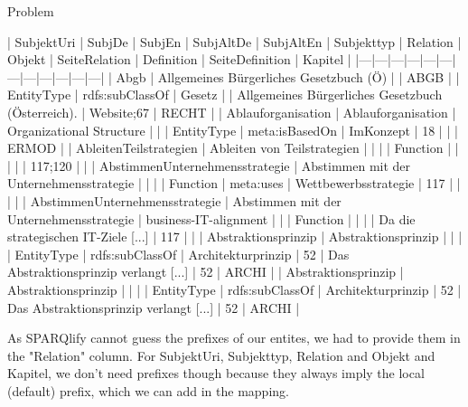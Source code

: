 \documentclass{beamer}
\begin{document}
\begin{frame}{Problem}
\begin{frame}{}
\begin{frame}{}
\begin{frame}{}
| SubjektUri                     	| SubjDe                                  	| SubjEn                   	| SubjAltDe 	| SubjAltEn 	| Subjekttyp  	| Relation        	| Objekt               	| SeiteRelation 	| Definition                                        	| SeiteDefinition 	| Kapitel 	|
|---|---|---|---|---|---|---|---|---|---|---|---|
| Abgb                           	| Allgemeines Bürgerliches Gesetzbuch (Ö) 	|                          	| ABGB      	|           	| EntityType  	| rdfs:subClassOf 	| Gesetz               	|               	| Allgemeines Bürgerliches Gesetzbuch (Österreich). 	| Website;67      	| RECHT   	|
| Ablauforganisation             	| Ablauforganisation                      	| Organizational Structure 	|           	|           	| EntityType  	| meta:isBasedOn  	| ImKonzept            	| 18            	|                                                   	|                 	| ERMOD   	|
| AbleitenTeilstrategien         	| Ableiten von Teilstrategien             	|                          	|           	|           	| Function    	|                 	|                      	|               	|                                                   	| 117;120         	|         	|
| AbstimmenUnternehmensstrategie 	| Abstimmen mit der Unternehmensstrategie 	|                          	|           	|           	| Function    	| meta:uses       	| Wettbewerbsstrategie 	| 117           	|                                                   	|                 	|         	|
| AbstimmenUnternehmensstrategie 	| Abstimmen mit der Unternehmensstrategie 	| business-IT-alignment    	|           	|           	| Function    	|                 	|                      	|               	| Da die strategischen IT-Ziele [...]               	| 117             	|         	|
| Abstraktionsprinzip            	| Abstraktionsprinzip                     	|                          	|           	|           	| EntityType  	| rdfs:subClassOf 	| Architekturprinzip   	| 52            	| Das Abstraktionsprinzip verlangt [...]            	| 52              	| ARCHI   	|
| Abstraktionsprinzip            	| Abstraktionsprinzip                     	|                          	|           	|           	| EntityType  	| rdfs:subClassOf 	| Architekturprinzip   	| 52            	| Das Abstraktionsprinzip verlangt [...]            	| 52              	| ARCHI   	|

As SPARQlify cannot guess the prefixes of our entites, we had to provide them in the "Relation" column.
For SubjektUri, Subjekttyp, Relation and Objekt and Kapitel, we don't need prefixes though because they always imply the local (default) prefix, which we can add in the mapping.


\end{frame}
\end{frame}
\end{frame}
\end{frame}
\end{document}
